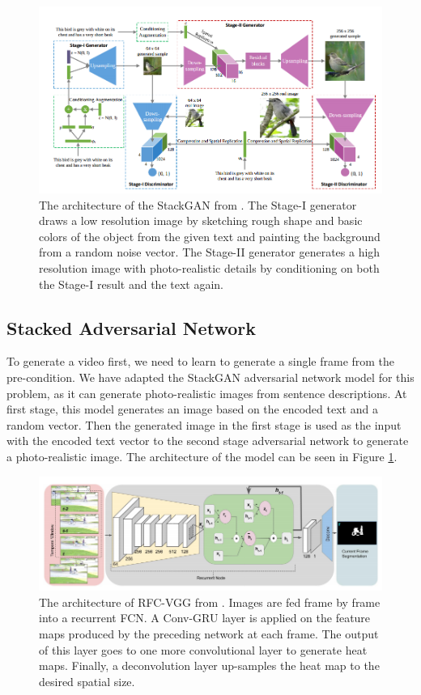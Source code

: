 \documentclass{article}
\begin{document}
\begin{figure}[h]
  \centering
  \includegraphics[scale=0.4]{stackgan.png} 
  \caption{The architecture of the StackGAN from \cite{stackGAN}. The Stage-I generator draws a low resolution image by sketching rough shape and basic colors of the object from the given text and painting the background from a random noise vector. The Stage-II generator generates a high resolution image with photo-realistic details by conditioning on both the Stage-I result and the text again.}
    \label{stackgan}
\end{figure}

\subsection{Stacked Adversarial Network}
To generate a video first, we need to learn to generate a single frame from the pre-condition. We have adapted the  StackGAN adversarial network model \cite{stackGAN} for this problem, as it can generate photo-realistic images from sentence descriptions. At first stage, this model generates an image based on the encoded text and a random vector. Then the generated image in the first stage is used as the input with the encoded text vector to the second stage adversarial network to generate a photo-realistic image. The architecture of the model can be seen in Figure \ref{stackgan}.

\begin{figure}[h]
  \centering
  \includegraphics[scale=0.4]{recurrent_fcn.png} 
  \caption{The architecture of RFC-VGG from \cite{rFCN}. Images are fed frame by frame into a recurrent FCN. A Conv-GRU layer is applied on the feature maps produced by the preceding network at each frame.
The output of this layer goes to one more convolutional layer to generate heat maps. Finally, a
deconvolution layer up-samples the heat map to the desired spatial size.}
  \label{recurrent_fcn}
\end{figure}
\end{document}
